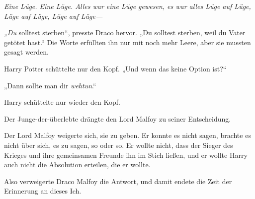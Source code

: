 \emph{Eine Lüge. Eine Lüge. Alles war eine Lüge gewesen, es war alles Lüge auf Lüge, Lüge auf Lüge, Lüge auf Lüge—}

\emph{„Du} solltest sterben“, presste Draco hervor. „Du solltest sterben, weil du Vater getötet hast.“ Die Worte erfüllten ihn nur mit noch mehr Leere, aber sie mussten gesagt werden.

Harry Potter schüttelte nur den Kopf. „Und wenn das keine Option ist?“

„Dann sollte man dir \emph{wehtun}.“

Harry schüttelte nur wieder den Kopf.

Der Junge-der-überlebte drängte den Lord Malfoy zu seiner Entscheidung.

Der Lord Malfoy weigerte sich, sie zu geben. Er konnte es nicht sagen, brachte es nicht über sich, es zu sagen, so oder so. Er wollte nicht, dass der Sieger des Krieges und ihre gemeinsamen Freunde ihn im Stich ließen, und er wollte Harry auch nicht die Absolution erteilen, die er wollte.

Also verweigerte Draco Malfoy die Antwort, und damit endete die Zeit der Erinnerung an dieses Ich.

\later

